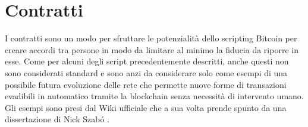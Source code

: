 \section{Contratti}\label{contratti}

I contratti sono un modo per sfruttare le potenzialità dello scripting Bitcoin per creare accordi tra persone in modo da limitare al minimo la fiducia da riporre in esse. Come per alcuni degli script precedentemente descritti, anche questi non sono considerati standard e sono anzi da considerare solo come esempi di una possibile futura evoluzione delle rete che permette nuove forme di transazioni evadibili in automatico tramite la blockchain senza necessità di intervento umano. Gli esempi sono presi dal Wiki ufficiale \cite{bitcoin-contracts} che a sua volta prende spunto da una dissertazione di Nick Szab\'{o} \cite{nick-szabo}.\\

